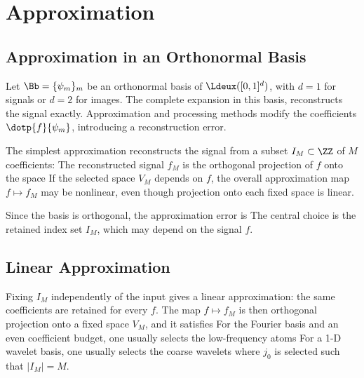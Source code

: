 \section{Approximation}

                                           
\subsection{Approximation in an Orthonormal Basis}

Let $\Bb = \{ \psi_m \}_m$ be an orthonormal basis of $\Ldeux([0,1]^d)$, with $d=1$ for signals or $d=2$ for images.
The complete expansion in this basis,
reconstructs the signal exactly. Approximation and processing methods modify the coefficients $\dotp{f}{\psi_m}$, introducing a reconstruction error.

The simplest approximation reconstructs the signal from a subset $I_M \subset \ZZ$ of $M$ coefficients:
The reconstructed signal $f_M$ is the orthogonal projection of $f$ onto the space
If the selected space $V_M$ depends on $f$, the overall approximation map $f \mapsto f_M$ may be nonlinear, even though projection onto each fixed space is linear.

Since the basis is orthogonal, the approximation error is 
The central choice is the retained index set $I_M$, which may depend on the signal $f$.

                                           
\subsection{Linear Approximation}

Fixing $I_M$ independently of the input gives a linear approximation: the same coefficients are retained for every $f$. The map $f \mapsto f_M$ is then orthogonal projection onto a fixed space $V_M$, and it satisfies
For the Fourier basis and an even coefficient budget, one usually selects the low-frequency atoms
For a 1-D wavelet basis, one usually selects the coarse wavelets
where $j_0$ is selected such that $|I_M|=M$.

